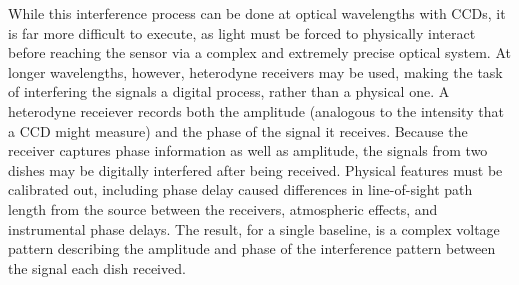




While this interference process can be done at optical wavelengths with CCDs, it is far more difficult to execute, as light must be forced to physically interact before reaching the sensor via a complex and extremely precise optical system. At longer wavelengths, however, heterodyne receivers may be used, making the task of interfering the signals a digital process, rather than a physical one. A heterodyne receiever records both the amplitude (analogous to the intensity that a CCD might measure) and the phase of the signal it receives. Because the receiver captures phase information as well as amplitude, the signals from two dishes may be digitally interfered after being received. Physical features must be calibrated out, including phase delay caused differences in line-of-sight path length from the source between the receivers, atmospheric effects, and instrumental phase delays. The result, for a single baseline, is a complex voltage pattern describing the amplitude and phase of the interference pattern between the signal each dish received.


